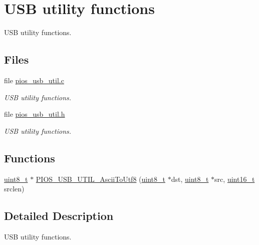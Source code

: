 \hypertarget{group___p_i_o_s___u_s_b___u_t_i_l}{\section{U\-S\-B utility functions}
\label{group___p_i_o_s___u_s_b___u_t_i_l}
}


U\-S\-B utility functions.  


\subsection*{Files}
\begin{DoxyCompactItemize}
\item 
file \hyperlink{pios__usb__util_8c}{pios\-\_\-usb\-\_\-util.\-c}
\begin{DoxyCompactList}\small\item\em U\-S\-B utility functions. \end{DoxyCompactList}\item 
file \hyperlink{pios__usb__util_8h}{pios\-\_\-usb\-\_\-util.\-h}
\begin{DoxyCompactList}\small\item\em U\-S\-B utility functions. \end{DoxyCompactList}\end{DoxyCompactItemize}
\subsection*{Functions}
\begin{DoxyCompactItemize}
\item 
\hyperlink{stdint_8h_aba7bc1797add20fe3efdf37ced1182c5}{uint8\-\_\-t} $\ast$ \hyperlink{group___p_i_o_s___u_s_b___u_t_i_l_gad53b22f8c49091387440392e18678ab8}{P\-I\-O\-S\-\_\-\-U\-S\-B\-\_\-\-U\-T\-I\-L\-\_\-\-Ascii\-To\-Utf8} (\hyperlink{stdint_8h_aba7bc1797add20fe3efdf37ced1182c5}{uint8\-\_\-t} $\ast$dst, \hyperlink{stdint_8h_aba7bc1797add20fe3efdf37ced1182c5}{uint8\-\_\-t} $\ast$src, \hyperlink{stdint_8h_a273cf69d639a59973b6019625df33e30}{uint16\-\_\-t} srclen)
\end{DoxyCompactItemize}


\subsection{Detailed Description}
U\-S\-B utility functions. 

